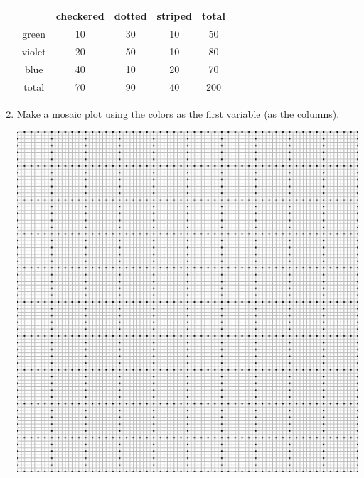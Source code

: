 \documentclass[12pt,letterpaper]{article}
\begin{document}
\begin{enumerate}
\newpage
\begin{center}
\begin{tabular}{c|c c c | c}
       & checkered & dotted & striped & total \\ \hline
green  & 10       &  30     &  10   & 50 \\
violet & 20       &  50     &  10   & 80 \\
blue   & 40       &  10     &  20   & 70 \\ \hline
total  & 70       &  90     &  40   & 200 
\end{tabular}
\end{center}
\item Make a mosaic plot using the colors as the first variable (as the columns).
\vfill
\begin{center}
\includegraphics[scale=1.2]{grid.png}
\end{center}

\end{enumerate}
\end{document}
